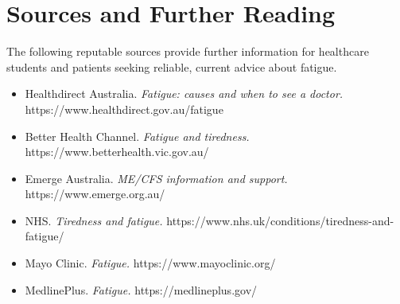 \section*{Sources and Further Reading}
The following reputable sources provide further information for healthcare students and patients seeking reliable, current advice about fatigue.
\begin{itemize}
    \item Healthdirect Australia. \textit{Fatigue: causes and when to see a doctor.} https://www.healthdirect.gov.au/fatigue
    \item Better Health Channel. \textit{Fatigue and tiredness.} https://www.betterhealth.vic.gov.au/
    \item Emerge Australia. \textit{ME/CFS information and support.} https://www.emerge.org.au/
    \item NHS. \textit{Tiredness and fatigue.} https://www.nhs.uk/conditions/tiredness-and-fatigue/
    \item Mayo Clinic. \textit{Fatigue.} https://www.mayoclinic.org/
    \item MedlinePlus. \textit{Fatigue.} https://medlineplus.gov/
\end{itemize}

